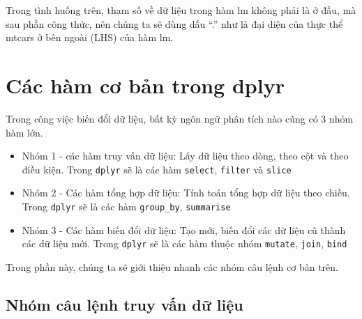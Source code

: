 \documentclass[]{krantz}
\makeatletter
\newenvironment{Shaded}{\begin{snugshade}}{\end{snugshade}}
\newcommand{\CommentTok}[1]{\textcolor[rgb]{0.37,0.37,0.37}{\textit{#1}}}
\newcommand{\DataTypeTok}[1]{\textcolor[rgb]{0.27,0.27,0.27}{#1}}
\newcommand{\KeywordTok}[1]{\textcolor[rgb]{0.27,0.27,0.27}{\textbf{#1}}}
\newcommand{\NormalTok}[1]{#1}
\newcommand{\OperatorTok}[1]{\textcolor[rgb]{0.43,0.43,0.43}{\textbf{#1}}}
\newcommand{\StringTok}[1]{\textcolor[rgb]{0.5,0.5,0.5}{#1}}
\providecommand{\tightlist}{%
  \setlength{\itemsep}{0pt}\setlength{\parskip}{0pt}}
\newenvironment{kframe}{%
\medskip{}
\setlength{\fboxsep}{.8em}
 \def\at@end@of@kframe{}%
 \ifinner\ifhmode%
  \def\at@end@of@kframe{\end{minipage}}%
  \begin{minipage}{\columnwidth}%
 \fi\fi%
 \def\FrameCommand##1{\hskip\@totalleftmargin \hskip-\fboxsep
 \colorbox{shadecolor}{##1}\hskip-\fboxsep
     \hskip-\linewidth \hskip-\@totalleftmargin \hskip\columnwidth}%
 \MakeFramed {\advance\hsize-\width
   \@totalleftmargin\z@ \linewidth\hsize
   \@setminipage}}%
 {\par\unskip\endMakeFramed%
 \at@end@of@kframe}
\renewenvironment{Shaded}{\begin{kframe}}{\end{kframe}}
\renewenvironment{Shaded}{\begin{snugshade}}{\end{snugshade}}
\renewcommand{\CommentTok}[1]{\textcolor[rgb]{0.56,0.35,0.01}{\textit{#1}}}
\renewcommand{\DataTypeTok}[1]{\textcolor[rgb]{0.13,0.29,0.53}{#1}}
\renewcommand{\KeywordTok}[1]{\textcolor[rgb]{0.13,0.29,0.53}{\textbf{#1}}}
\renewcommand{\NormalTok}[1]{#1}
\renewcommand{\OperatorTok}[1]{\textcolor[rgb]{0.81,0.36,0.00}{\textbf{#1}}}
\renewcommand{\StringTok}[1]{\textcolor[rgb]{0.31,0.60,0.02}{#1}}
\theoremstyle{definition}
\theoremstyle{definition}
\theoremstyle{definition}
\theoremstyle{remark}
\makeatother
\begin{document}
\begin{Shaded}
\end{Shaded}

Trong tình huống trên, tham số về dữ liệu trong hàm lm không phải là ở
đầu, mà sau phần công thức, nên chúng ta sẽ dùng dấu ``.'' như là đại
diện của thực thể mtcars ở bên ngoài (LHS) của hàm lm.

\hypertarget{cac-ham-co-ban-trong-dplyr}{%
\section{Các hàm cơ bản trong dplyr}\label{cac-ham-co-ban-trong-dplyr}}

Trong công việc biến đổi dữ liệu, bất kỳ ngôn ngữ phân tích nào cũng có
3 nhóm hàm lớn.

\begin{itemize}
\tightlist
\item
  Nhóm 1 - các hàm truy vấn dữ liệu: Lấy dữ liệu theo dòng, theo cột và
  theo điều kiện. Trong \texttt{dplyr} sẽ là các hàm \texttt{select},
  \texttt{filter} và \texttt{slice}
\item
  Nhóm 2 - Các hàm tổng hợp dữ liệu: Tính toán tổng hợp dữ liệu theo
  chiều. Trong \texttt{dplyr} sẽ là các hàm \texttt{group\_by},
  \texttt{summarise}
\item
  Nhóm 3 - Các hàm biến đổi dữ liệu: Tạo mới, biến đổi các dữ liệu cũ
  thành các dữ liệu mới. Trong \texttt{dplyr} sẽ là các hàm thuộc nhóm
  \texttt{mutate}, \texttt{join}, \texttt{bind}
\end{itemize}

Trong phần này, chúng ta sẽ giới thiệu nhanh các nhóm câu lệnh cơ bản
trên.

\hypertarget{nhom-cau-lnh-truy-vn-d-liu}{%
\subsection{Nhóm câu lệnh truy vấn dữ
liệu}\label{nhom-cau-lnh-truy-vn-d-liu}}
\end{document}
